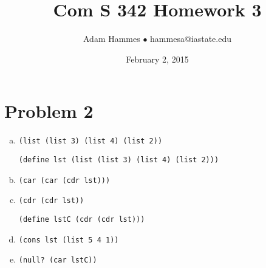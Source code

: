 \documentclass[11pt]{article}
\newcommand{\code}[1]{\texttt{#1}}
\begin{document}
\title{Com S 342 Homework 3}
\author{Adam Hammes $\bullet$ hammesa@iastate.edu}
\date{February 2, 2015}
\maketitle

\section*{Problem 2}

\begin{enumerate}[(a)]
	\item \code{(list (list 3) (list 4) (list 2))}

		  \code{(define lst (list (list 3) (list 4) (list 2)))}
	\item \code{(car (car (cdr lst)))}
	\item \code{(cdr (cdr lst))}

		  \code{(define lstC (cdr (cdr lst)))}
	\item \code{(cons lst (list 5 4 1))}
	\item \code{(null? (car lstC))}

\end{enumerate}
\end{document}
